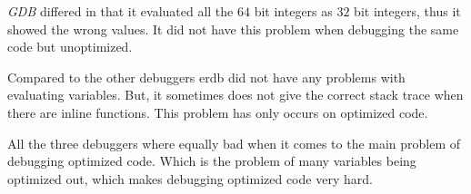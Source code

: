 \emph{GDB} differed in that it evaluated all the $64$ bit integers as $32$ bit integers, thus it showed the wrong values.
It did not have this problem when debugging the same code but unoptimized.


Compared to the other debuggers \gls{erdb} did not have any problems with evaluating variables.
But, it sometimes does not give the correct stack trace when there are inline functions.
This problem has only occurs on optimized code.


All the three debuggers where equally bad when it comes to the main problem of debugging optimized code.
Which is the problem of many variables being optimized out, which makes debugging optimized code very hard.

